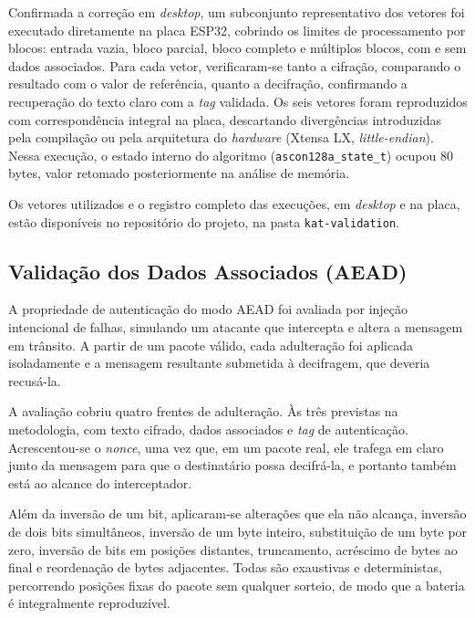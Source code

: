 Confirmada a correção em \textit{desktop}, um subconjunto representativo dos vetores foi executado diretamente na placa ESP32, cobrindo os limites de processamento por blocos: entrada vazia, bloco parcial, bloco completo e múltiplos blocos, com e sem dados associados. Para cada vetor, verificaram-se tanto a cifração, comparando o resultado com o valor de referência, quanto a decifração, confirmando a recuperação do texto claro com a \textit{tag} validada. Os seis vetores foram reproduzidos com correspondência integral na placa, descartando divergências introduzidas pela compilação ou pela arquitetura do \textit{hardware} (Xtensa LX, \textit{little-endian}). Nessa execução, o estado interno do algoritmo (\texttt{ascon128a\_state\_t}) ocupou 80 bytes, valor retomado posteriormente na análise de memória.

Os vetores utilizados e o registro completo das execuções, em \textit{desktop} e na placa, estão disponíveis no repositório do projeto, na pasta \texttt{kat-validation}.


\subsection{Validação dos Dados Associados (AEAD)}
\label{subsec:aead_resultados}

A propriedade de autenticação do modo AEAD foi avaliada por injeção intencional de falhas, simulando um atacante que intercepta e altera a mensagem em trânsito. A partir de um pacote válido, cada adulteração foi aplicada isoladamente e a mensagem resultante submetida à decifragem, que deveria recusá-la.

A avaliação cobriu quatro frentes de adulteração. Às três previstas na metodologia, com texto cifrado, dados associados e \textit{tag} de autenticação. Acrescentou-se o \textit{nonce}, uma vez que, em um pacote real, ele trafega em claro junto da mensagem para que o destinatário possa decifrá-la, e portanto também está ao alcance do interceptador.

Além da inversão de um bit, aplicaram-se alterações que ela não alcança, inversão de dois bits simultâneos, inversão de um byte inteiro, substituição de um byte por zero, inversão de bits em posições distantes, truncamento, acréscimo de bytes ao final e reordenação de bytes adjacentes. Todas são exaustivas e deterministas, percorrendo posições fixas do pacote sem qualquer sorteio, de modo que a bateria é integralmente reproduzível.

